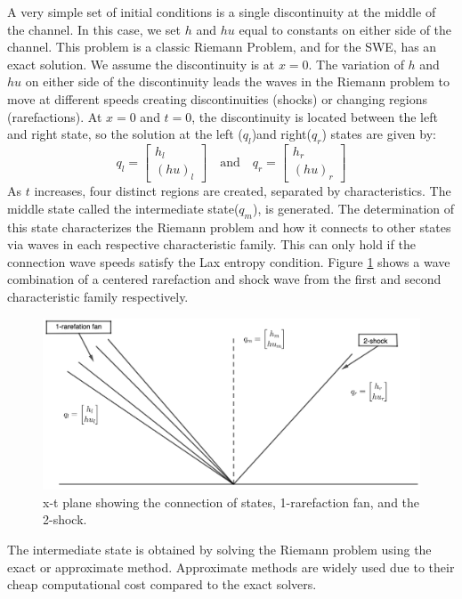 \documentclass[12pt,a4paper]{article}
\begin{document}
	A very simple set of initial conditions is a single discontinuity at the middle of the channel.  In this case, we set $h$ and $hu$ equal to constants on either side of the channel.  This problem is a classic Riemann Problem, and for the SWE, has an exact solution.  We assume the discontinuity is at $x = 0$. 
	The variation of $h$ and $hu$ on either side of the discontinuity leads the waves in the Riemann problem to move at different speeds creating discontinuities (shocks) or changing regions (rarefactions)\cite{leveque2002finite}.  At $x = 0$ and $t = 0$,   the discontinuity is located between the left and right state, so the solution at the left ($q_{l}$)and right($q_{r}$) states are given by: 
	\begin{equation}
		q_{l} = \begin{bmatrix}
			h_{l} \\( hu)_{l}
		\end{bmatrix}  \quad \text{and} \quad q_{r} = \begin{bmatrix}
			h_{r} \\( hu)_{r}
		\end{bmatrix} 
		\label{ic}
	\end{equation}
	As $t$ increases, four distinct regions are created, separated by characteristics. 
	The middle state called the intermediate state($q_{m}$), is generated.  The determination of this state characterizes the Riemann problem and how it connects to other states via waves in each respective characteristic family\cite{ba-le-mi-ro:2003}.  This can only hold if the connection wave speeds satisfy the Lax entropy condition. Figure \ref{fig:x-tplane} shows a wave combination of a centered rarefaction  and shock wave from the first and second characteristic family respectively.
	
	\begin{figure}[H]
		\centering
		\includegraphics[width=0.5\linewidth]{images/geo1}
		\caption{ x-t plane showing the connection of states, 1-rarefaction fan, and the 2-shock.}
		\label{fig:x-tplane}
	\end{figure}
	
	The intermediate state is obtained by solving the Riemann problem using the exact or  approximate method. Approximate methods are widely used due to their cheap computational cost compared to the exact solvers.
	
\end{document}
